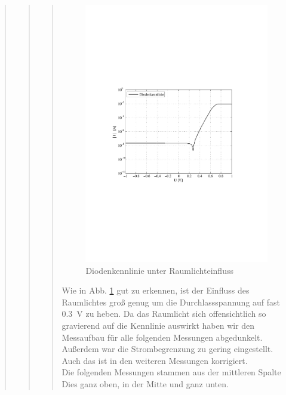 \begin{quote}
\begin{quote}
\begin{quote}
            \begin{figure}[H]
                \centering
                \includegraphics[scale=0.7, trim = 3.1cm 9.2cm 4cm 8.5cm, clip]{KennlinienBilder/raumlicht_kennlinie}
                \caption{Diodenkennlinie unter Raumlichteinfluss}
                \label{fig:raumlicht_kennlinie}
            \end{figure}

            Wie in Abb. \ref{fig:raumlicht_kennlinie} gut zu erkennen, ist der Einfluss des Raumlichtes groß genug um die
            Durchlassspannung auf fast \SI{0,3}{\volt} zu heben. Da das Raumlicht sich offensichtlich so gravierend auf
            die Kennlinie auswirkt haben wir den Messaufbau für alle folgenden Messungen abgedunkelt.
            Außerdem war die Strombegrenzung zu gering eingestellt. Auch das ist in den weiteren Messungen korrigiert.
            \\
            Die folgenden Messungen stammen aus der mittleren Spalte Dies ganz oben, in der Mitte und ganz unten.



\end{quote}
\end{quote}
\end{quote}
